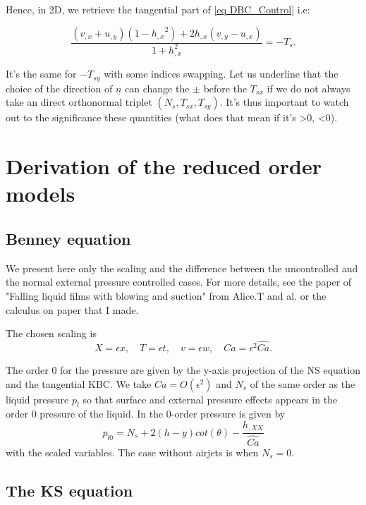 \documentclass[12pt]{article}
\begin{document}
Hence, in 2D, we retrieve the tangential part of \eqref{eq DBC_Control} i.e: 

$$    \frac{(v_{,x} + u_{,y})(1-{h_{,x}}^2)+2h_{,x}(v_{,y}-u_{,x})}{1+h_{,x}^2}= -T_s. $$

It's the same for $-T_{sy}$ with some indices swapping. Let us underline that the choice of the direction of $\underline{n}$ can change the $\pm$ before the $T_{sx}$ if we do not always take an direct orthonormal triplet $(N_s, T_{sx}, T_{sy})$. It's thus important to watch out to the significance these quantities (what does that mean if it's >0, <0). 

\section{Derivation of the reduced order models}
\subsection{Benney equation}
We present here only the scaling and the difference between the uncontrolled and the normal external pressure controlled cases. For more details, see the paper of "Falling liquid films with blowing and suction" from Alice.T and al. or the calculus on paper that I made. 

The chosen scaling is $$X=\epsilon x, \quad T=\epsilon t, \quad v=\epsilon w, \quad Ca=\epsilon^2 \hat{Ca}.$$

The order 0 for the pressure are given by the y-axis projection of the NS equation and the tangential KBC. We take $Ca=O(\epsilon^2)$ and $N_s$ of the same order as the liquid pressure $p_l$ so that surface and external pressure effects appears in the order 0 pressure of the liquid. In the 0-order pressure is given by $$p_{l0} = N_s+2(h-y)cot(\theta)-\frac{h_{,XX}}{\hat{Ca}}$$ with the scaled variables. The case without airjets is when $N_s=0$.

\subsection{The KS equation}

\printbibliography
\end{document}
